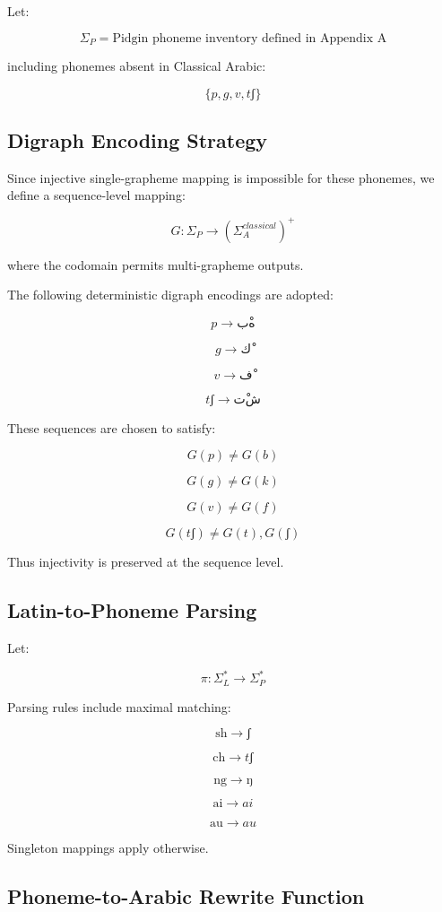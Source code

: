 \documentclass[12pt]{article}
\begin{document}
Let:

\[
\Sigma_P = \text{Pidgin phoneme inventory defined in Appendix A}
\]

including phonemes absent in Classical Arabic:

\[
\{ p, g, v, tʃ \}
\]

\subsection{Digraph Encoding Strategy}

Since injective single-grapheme mapping is impossible for these phonemes, we define a sequence-level mapping:

\[
G : \Sigma_P \rightarrow (\Sigma_A^{classical})^+
\]

where the codomain permits multi-grapheme outputs.

The following deterministic digraph encodings are adopted:

\[
p \rightarrow بْه
\]

\[
g \rightarrow كْ
\]

\[
v \rightarrow فْ
\]

\[
tʃ \rightarrow تْش
\]

These sequences are chosen to satisfy:

\[
G(p) \neq G(b)
\]

\[
G(g) \neq G(k)
\]

\[
G(v) \neq G(f)
\]

\[
G(tʃ) \neq G(t), G(ʃ)
\]

Thus injectivity is preserved at the sequence level.

\subsection{Latin-to-Phoneme Parsing}

Let:

\[
\pi : \Sigma_L^* \rightarrow \Sigma_P^*
\]

Parsing rules include maximal matching:

\[
\text{sh} \rightarrow ʃ
\]

\[
\text{ch} \rightarrow tʃ
\]

\[
\text{ng} \rightarrow ŋ
\]

\[
\text{ai} \rightarrow ai
\]

\[
\text{au} \rightarrow au
\]

Singleton mappings apply otherwise.

\subsection{Phoneme-to-Arabic Rewrite Function}
\end{document}

